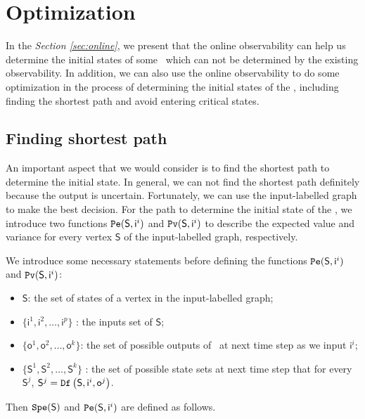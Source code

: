 \section{Optimization}
\label{sec:app}

In the {\em Section \ref{sec:online}}, we present that the online observability can help us determine the initial states of some \BCNs\ which can not be determined by the existing observability. 
In addition, we can also use the online observability to do some optimization in the process of determining the initial states of the \BCNs, including finding the shortest path and avoid entering critical states. 

\subsection{Finding shortest path}
An important aspect that we would consider is to find the shortest path to determine the initial state. In general, we can not find the shortest path definitely because the output is uncertain. Fortunately, we can use the input-labelled graph to make the best decision. For the path to determine the initial state of the \BCNs, we introduce two functions ${\tt Pe}(\mathsf{S},\mathsf{ i}^{i})$ and ${\tt Pv}(\mathsf{S},\mathsf{ i}^{i})$ to describe the expected value and variance for every vertex $\mathsf{S}$ of the input-labelled graph, respectively.%

We introduce some necessary statements before defining the functions ${\tt Pe}(\mathsf{S},\mathsf{ i}^{i})$ and ${\tt Pv}(\mathsf{S},\mathsf{ i}^{i})$:
\begin{itemize}
  \item $\mathsf{S}$: the set of states of a vertex in the input-labelled graph;
  \item $\{\mathsf{ i}^{1},\mathsf{ i}^{2},\ldots, \mathsf{ i}^{p}\}$ : the inputs set of $\mathsf{S}$;
  \item $\{\mathsf{o}^1,\mathsf{o}^2,\ldots,\mathsf{o}^k\}$: the set of possible outputs of \BCN\ at next time step as we input $\mathsf{ i}^{i}$;
 \item $\{\mathsf{S}^{1},\mathsf{S}^{2},\ldots, \mathsf{S}^{k}\}$ : the set of possible state sets at next time step that for every $\mathsf{S}^{j}$, $\mathsf{S}^{j}={\tt Df}\left(\mathsf{S},\mathsf{i}^{i},\mathsf{o}^{j}\right)$.
  
\end{itemize} 

Then ${\tt Spe}(\mathsf{S})$ and ${\tt Pe}(\mathsf{S},\mathsf{ i}^{i})$ are defined as follows.

